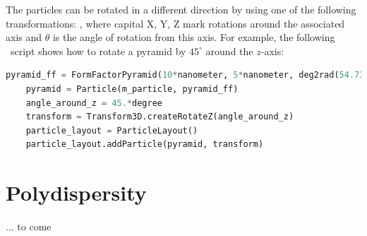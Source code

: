 The particles can be rotated in a different direction by using one of
the following transformations: , where capital X, Y, Z mark rotations
around the associated axis and $\theta$ is the
angle of rotation from this axis. For example, the following \ script shows how to rotate a pyramid by $45^{\circ}$ around
the $z$-axis:\\

\begin{lstlisting}[language=python, style=eclipseboxed,numbers=none,nolol]
    pyramid_ff = FormFactorPyramid(10*nanometer, 5*nanometer, deg2rad(54.73 ) )
    pyramid = Particle(m_particle, pyramid_ff)
    angle_around_z = 45.*degree
    transform = Transform3D.createRotateZ(angle_around_z)
    particle_layout = ParticleLayout()
    particle_layout.addParticle(pyramid, transform) 
\end{lstlisting}

\section{Polydispersity}

... to come

